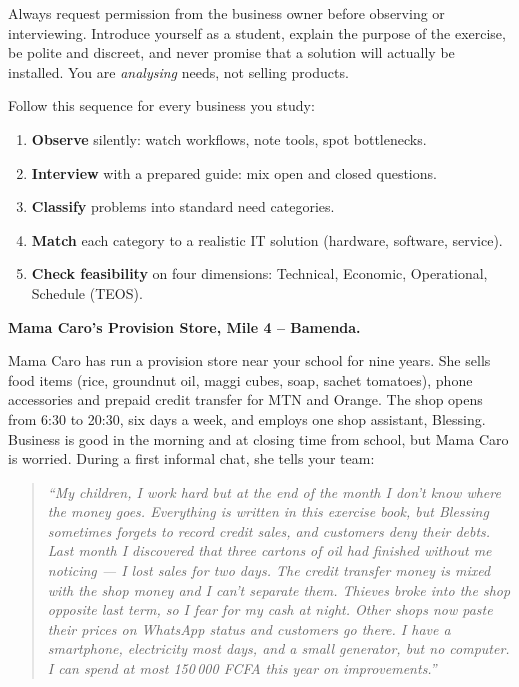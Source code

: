 \documentclass[11pt]{article}
\newcounter{popsec}
\newcounter{popsub}
\newcommand{\courssub}[1]{%
  \stepcounter{popsub}%
  \par\vspace{9pt}\noindent{\popxbold\fontsize{11.5}{13}\selectfont\color{popink}{\color{poporange}\thepopsec.\thepopsub}\hspace{6pt}#1}\par\nopagebreak\vspace{4pt}
}
\begin{document}
\begin{attention}
Always request permission from the business owner before observing or interviewing. Introduce yourself as a student, explain the purpose of the exercise, be polite and discreet, and never promise that a solution will actually be installed. You are \emph{analysing} needs, not selling products.
\end{attention}

\begin{methode}
Follow this sequence for every business you study:
\begin{enumerate}
\item \textbf{Observe} silently: watch workflows, note tools, spot bottlenecks.
\item \textbf{Interview} with a prepared guide: mix open and closed questions.
\item \textbf{Classify} problems into standard need categories.
\item \textbf{Match} each category to a realistic IT solution (hardware, software, service).
\item \textbf{Check feasibility} on four dimensions: Technical, Economic, Operational, Schedule (TEOS).
\end{enumerate}
\end{methode}

\courssub{Situation}

\textbf{Mama Caro's Provision Store, Mile 4 -- Bamenda.}\par
\medskip
Mama Caro has run a provision store near your school for nine years. She sells food items (rice, groundnut oil, maggi cubes, soap, sachet tomatoes), phone accessories and prepaid credit transfer for MTN and Orange. The shop opens from 6:30 to 20:30, six days a week, and employs one shop assistant, Blessing. Business is good in the morning and at closing time from school, but Mama Caro is worried. During a first informal chat, she tells your team:

\begin{quote}
\emph{``My children, I work hard but at the end of the month I don't know where the money goes. Everything is written in this exercise book, but Blessing sometimes forgets to record credit sales, and customers deny their debts. Last month I discovered that three cartons of oil had finished without me noticing --- I lost sales for two days. The credit transfer money is mixed with the shop money and I can't separate them. Thieves broke into the shop opposite last term, so I fear for my cash at night. Other shops now paste their prices on WhatsApp status and customers go there. I have a smartphone, electricity most days, and a small generator, but no computer. I can spend at most 150\,000 FCFA this year on improvements.''}
\end{quote}
\end{document}
